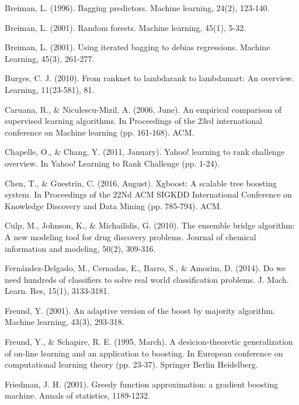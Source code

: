 \clearpagebiblio
\begin{thebibliography}{99}
\medskip

\small

Breiman, L. (1996). Bagging predictors. Machine learning, 24(2), 123-140.

Breiman, L. (2001). Random forests. Machine learning, 45(1), 5-32.

Breiman, L. (2001). Using iterated bagging to debias regressions. Machine Learning, 45(3), 261-277.

Burges, C. J. (2010). From ranknet to lambdarank to lambdamart: An overview. Learning, 11(23-581), 81.

Caruana, R., \& Niculescu-Mizil, A. (2006, June). An empirical comparison of supervised learning algorithms. In Proceedings of the 23rd international conference on Machine learning (pp. 161-168). ACM.

Chapelle, O., \& Chang, Y. (2011, January). Yahoo! learning to rank challenge overview. In Yahoo! Learning to Rank Challenge (pp. 1-24).

Chen, T., \& Guestrin, C. (2016, August). Xgboost: A scalable tree boosting system. In Proceedings of the 22Nd ACM SIGKDD International Conference on Knowledge Discovery and Data Mining (pp. 785-794). ACM.

Culp, M., Johnson, K., \& Michailidis, G. (2010). The ensemble bridge algorithm: A new modeling tool for drug discovery problems. Journal of chemical information and modeling, 50(2), 309-316.

Fernández-Delgado, M., Cernadas, E., Barro, S., \& Amorim, D. (2014). Do we need hundreds of classifiers to solve real world classification problems. J. Mach. Learn. Res, 15(1), 3133-3181.

Freund, Y. (2001). An adaptive version of the boost by majority algorithm. Machine learning, 43(3), 293-318.

Freund, Y., \& Schapire, R. E. (1995, March). A desicion-theoretic generalization of on-line learning and an application to boosting. In European conference on computational learning theory (pp. 23-37). Springer Berlin Heidelberg.

Friedman, J. H. (2001). Greedy function approximation: a gradient boosting machine. Annals of statistics, 1189-1232.


\end{thebibliography}

